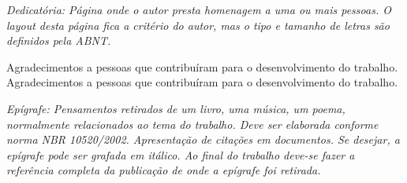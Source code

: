 \documentclass{abntpuc}
\begin{document}














\capa


\folharosto


\folhaaprovacao


\dedicatoria
{
	\textit{Dedicatória: Página onde o autor presta homenagem a uma ou mais pessoas.
	O layout desta página fica a critério do autor, mas o tipo e tamanho de letras são definidos pela ABNT.}
}


\agradecimentos
{
	Agradecimentos a pessoas que contribuíram para o desenvolvimento do trabalho.
	Agradecimentos a pessoas que contribuíram para o desenvolvimento do trabalho.
}


\epigrafe
{
	\textit{Epígrafe: Pensamentos retirados de um livro, uma música, um poema, normalmente relacionados ao tema do trabalho.
	Deve ser elaborada conforme norma NBR 10520/2002. Apresentação de citações em documentos.
	Se desejar, a epígrafe pode ser grafada em itálico.
	Ao final do trabalho deve-se fazer a referência completa da publicação de onde a epígrafe foi retirada.}
}
\end{document}
